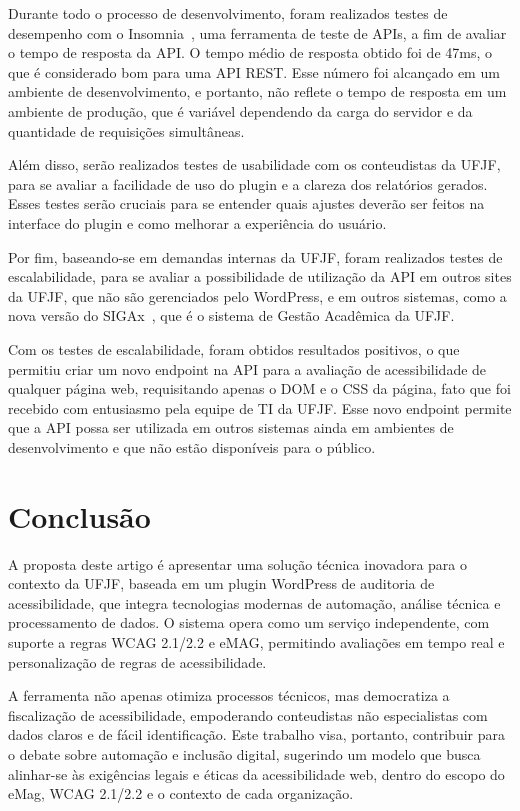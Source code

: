 \documentclass[
	article,			%
	12pt,				%
	oneside,			%
	a4paper,			%
	section=TITLE,		%
	subsection=TITLE,	%
	english,			%
	brazil,				%
	sumario=tradicional
	]{abntex2}
\begin{document}
Durante todo o processo
de desenvolvimento, foram realizados testes de desempenho com o Insomnia~\cite{insomnia},
uma ferramenta de teste de APIs, a fim de avaliar o tempo de resposta da API. 
O tempo médio de resposta obtido foi de 47ms, o que é considerado
bom para uma API REST. Esse número foi alcançado em um ambiente
de desenvolvimento, e portanto, não reflete o tempo de resposta em um
ambiente de produção, que é variável dependendo da
carga do servidor e da quantidade de requisições simultâneas.

Além disso, serão realizados testes de usabilidade com os conteudistas da
UFJF, para se avaliar a facilidade de uso do plugin e a clareza dos relatórios
gerados. Esses testes serão cruciais para se entender quais ajustes deverão
ser feitos na interface do plugin e como melhorar a experiência do usuário.

Por fim, baseando-se em demandas internas da UFJF, foram realizados testes
de escalabilidade, para se avaliar a possibilidade de utilização da API
em outros sites da UFJF, que não são gerenciados pelo WordPress, e em outros sistemas, 
como a nova versão do SIGAx~\cite{SIGAx}, que é o sistema de Gestão Acadêmica da UFJF\@.

Com os testes de escalabilidade, foram obtidos resultados positivos, o que 
permitiu criar um novo endpoint na API para a avaliação de acessibilidade
de qualquer página web, requisitando apenas o DOM e o CSS da página, fato que foi recebido
com entusiasmo pela equipe de TI da UFJF\@. Esse novo endpoint permite que
a API possa ser utilizada em outros sistemas ainda em ambientes de desenvolvimento 
e que não estão disponíveis para o público.

\chapter*{Conclusão}
A proposta deste artigo é apresentar uma solução técnica inovadora para o
contexto da UFJF, baseada em um plugin WordPress de auditoria de acessibilidade, 
que integra tecnologias modernas de automação, análise técnica e
processamento de dados. O sistema opera como um serviço independente, com
suporte a regras WCAG 2.1/2.2 e eMAG, permitindo avaliações em tempo real
e personalização de regras de acessibilidade.

A ferramenta não apenas otimiza processos técnicos, mas democratiza
a fiscalização de acessibilidade, empoderando conteudistas não especialistas
com dados claros e de fácil identificação. Este trabalho visa, portanto, contribuir
para o debate sobre automação e inclusão digital, sugerindo um modelo que busca alinhar-se às exigências legais e éticas da
acessibilidade web, dentro do escopo do eMag, WCAG 2.1/2.2 e o contexto de cada
organização.
\end{document}
